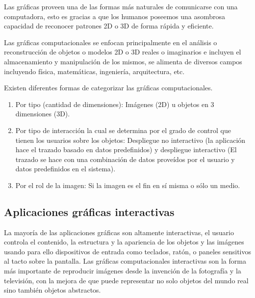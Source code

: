 \documentclass[12pt,a4paper,spanish,openany]{book}
\begin{document}



Las gráficas proveen una de las formas más naturales de comunicarse con una
computadora, esto es gracias a que los humanos poseemos una asombrosa capacidad
de reconocer patrones \gls{2D} o \gls{3D} de forma rápida y eficiente.

Las gráficas computacionales se enfocan principalmente en el análisis o
reconstrucción de objetos  o modelos 2D o 3D reales o imaginarios e incluyen el
almacenamiento y manipulación de los mismos, se alimenta de
diversos campos incluyendo física, matemáticas, ingeniería, arquitectura, etc.

Existen diferentes formas de categorizar las gráficas computacionales.
\begin{enumerate}
  \item Por tipo (cantidad de dimensiones): Imágenes (2D) u objetos en 3
  dimensiones (3D).
  \item Por tipo de interacción la cual se determina por el grado de
  control que tienen los usuarios sobre los objetos: Despliegue no interactivo
  (la aplicación hace el trazado basado en datos predefinidos) y despliegue
  interactivo (El trazado se hace con una combinación de datos proveídos por el usuario y
  datos predefinidos en el sistema).
  \item Por el rol de la imagen: Si la imagen es el fin en sí misma o sólo un
  medio.
\end{enumerate}


\subsection{Aplicaciones gráficas interactivas}

La mayoría de las aplicaciones gráficas son altamente interactivas, el usuario
controla el contenido, la estructura y la apariencia de los objetos y las imágenes usando
para ello dispositivos de entrada como teclados, ratón, o paneles sensitivos al
tacto sobre la pantalla. Las gráficas computacionales interactivas son la forma
más importante de reproducir imágenes desde la invención de la fotografía y la
televisión, con la mejora de que puede representar no solo objetos del mundo
real sino también objetos abstractos.
\end{document}
